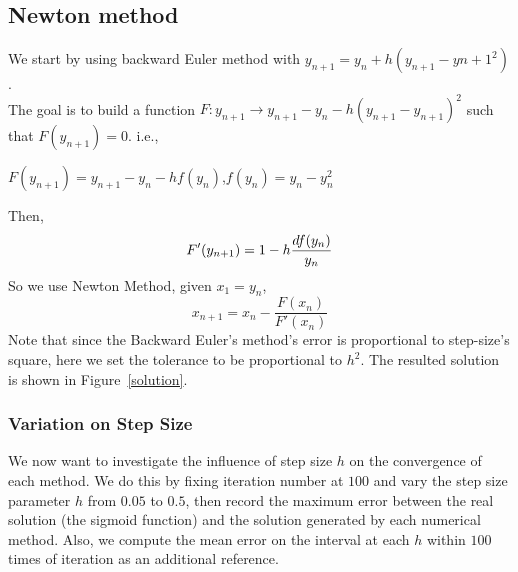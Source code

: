 \documentclass[
11pt, %
a4paper, %
oneside, %
headinclude,footinclude, %
BCOR5mm, %
]{scrartcl}
\begin{document}
\subsection{Newton method}
We start by using backward Euler method with $y_{n+1} = y_n + h(y_{n+1} - {y{n+1}}^2)$.\\
The goal is to build a function $F : y_{n+1} \rightarrow y_{n+1} - y_{n} - h(y_{n+1}-{y_{n+1}})^2$ such that $F(y_{n+1}) = 0$. i.e.,
\begin{center}
$F(y_{n+1}) = y_{n+1} - y_n -hf(y_n)$,\quad $f(y_n) = y_n - y_n^{2}$   
\end{center}
Then,
\begin{equation}
    F'(y_{n+1}) = 1 - h\frac{df(y_n)}{y_n} \notag
\end{equation}
So we use Newton Method, given $x_1 = y_n$,
\begin{equation}
    x_{n+1} = x_{n} - \frac{F(x_n)}{F'(x_n)} \tag{3.4}
\end{equation}
Note that since the Backward Euler's method's error is proportional to step-size's square, here we set the tolerance to be proportional to $h^2$. The resulted solution is shown in Figure~\vref{solution}.

\subsubsection{Variation on Step Size}
We now want to investigate the influence of step size $h$ on the convergence of each method. We do this by fixing iteration number at $100$ and vary the step size parameter $h$ from $0.05$ to $0.5$, then record the maximum error between the real solution (the sigmoid function) and the solution generated by each numerical method. Also, we compute the mean error on the interval at each $h$ within $100$ times of iteration as an additional reference.
\end{document}
